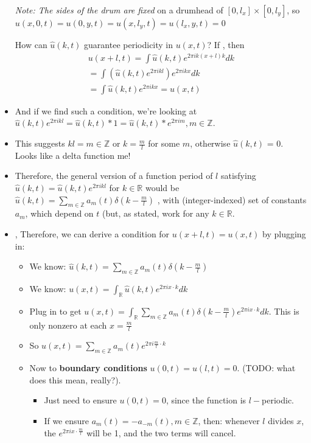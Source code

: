 \documentclass[11pt, oneside]{article}   	%
\begin{document}
\begin{itemize}
\emph{Note: The sides of the drum are fixed} on a drumhead of $[0, l_x] \times [0, l_y]$, so $u(x, 0, t) = u(0, y, t) = u(x, l_y, t) = u(l_x, y, t) = 0$

How can $\hat{u}(k,t)$ guarantee periodicity in $u(x,t)$? 
If , then 
\begin{align}
u(x+l, t) = \int \hat{u}(k,t)e^{2\pi i k (x+l)k} dk \\
=  \int (\hat{u}(k,t)e^{2\pi i k l}) e^{2\pi i k x} dk \\
 = \int \hat{u}(k,t) e^{2\pi i k x} = u(x, t) 
\end{align}
\item And if we find such a condition, we're looking at $\hat{u}(k,t)e^{2 \pi i k l} = \hat{u}(k,t)*1 = \hat{u}(k,t) * e^{2 \pi i m}, m \in \mathbb{Z}$.
\item This suggests $kl = m \in \mathbb{Z}$ or $k = \frac{m}{l}$ for some $m$, otherwise $\hat{u}(k,t)$ = 0.  Looks like a delta function me!
\item Therefore, the general version of a function period of $l$ satisfying $\hat{u}(k,t) = \hat{u}(k,t) e^{2\pi i k l}$ for $k \in \mathbb{R}$ would be $\hat{u}(k,t) = \sum_{m \in \mathbb{Z}} a_m(t)\delta(k-\frac{m}{l})$ , with (integer-indexed) set of constants $a_m$, which depend on $t$ (but, as stated, work for any $k \in \mathbb{R}$.
\item, Therefore, we can derive a condition for $u(x+l, t) = u(x,t)$ by plugging in:
\begin{itemize}
\item We know: $\hat{u}(k,t) = \sum_{m \in \mathbb{Z}} a_m(t)\delta(k-\frac{m}{l})$
\item We know: $u(x,t) = \int_{\mathbb{R}} \hat{u}(k,t)e^{2\pi i x\cdot k}dk$
\item Plug in to get $u(x,t) =  \int_{\mathbb{R}} \sum_{m \in \mathbb{Z}} a_m(t)\delta(k-\frac{m}{l})e^{2\pi i x\cdot k}dk$.  This is only nonzero at each $x = \frac{m}{l}$
\item So $u(x,t) = \sum_{m \in \mathbb{Z}} a_m(t)e^{2\pi i \frac{m}{l} \cdot k}$
\item Now to \textbf{boundary conditions} $u(0,t) = u(l,t) = 0.$ (TODO: what does this mean, really?).
\begin{itemize}
\item Just need to ensure $u(0,t) = 0$, since the function is $l-$periodic.
\item If we ensure $a_m(t) = -a_{-m}(t), m \in \mathbb{Z}$, then: whenever $l$ divides $x$, the $e^{2\pi i x \cdot \frac{m}{l}}$ will be 1, and the two terms will cancel.  

\end{itemize}
\end{itemize}
\end{itemize}
\end{document}
